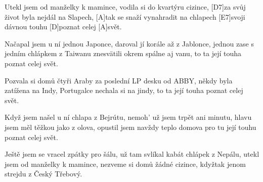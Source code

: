 
\sloka
[A]Utekl jsem od manželky k mamince,
vodila si do kvartýru cizince,
[D7]za svůj život byla nejdál na Slapech,
[A]tak se snaží vynahradit na chlapech
[E7]svoji dávnou touhu [D]poznat celej [A]svět.

\sloka
Načapal jsem u ní jednou Japonce,
daroval jí korále až z Jablonce,
jednou zase s jedním chlápkem z Taiwanu
znesvätili okrem spálne aj vanu,
to ta její touha poznat celej svět.

\sloka
Pozvala si domů čtyři Araby
za poslední LP desku od ABBY,
někdy byla zatížena na Indy,
Portugalce nechala si na jindy,
to ta její touha poznat celej svět.

\sloka
Když jsem našel u ní chlapa z Bejrútu,
nemoh' už jsem trpět ani minutu,
hlavu jsem měl těžkou jako z olova,
opustil jsem navždy teplo domova
pro tu její touhu poznat celej svět.

\sloka
Ještě jsem se vracel zpátky pro šálu,
už tam svlíkal kabát chlápek z Nepálu,
utekl jsem od manželky k mamince,
nezveme si domů žádné cizince,
kdyžtak jenom strejdu z Český Třebový.
